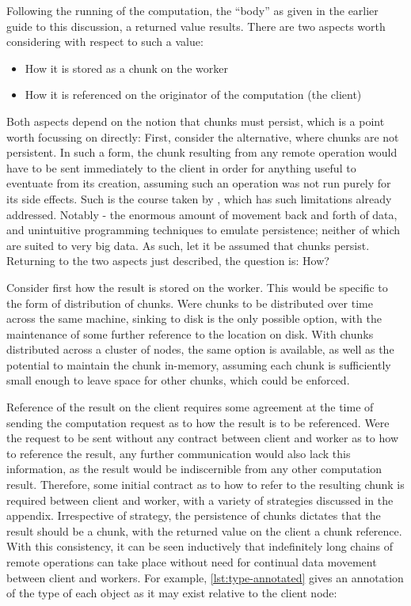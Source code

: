 Following the running of the computation, the ``body'' as given in the earlier guide to this discussion, a returned value results.
There are two aspects worth considering with respect to such a value:

\begin{itemize} \item How it is stored as a chunk on the worker \item How it is referenced on the originator of the computation (the client) \end{itemize}

Both aspects depend on the notion that chunks must persist, which is a point worth focussing on directly: First, consider the alternative, where chunks are not persistent.
In such a form, the chunk resulting from any remote operation would have to be sent immediately to the client in order for anything useful to eventuate from its creation, assuming such an operation was not run purely for its side effects.
Such is the course taken by , which has such limitations already addressed.
Notably - the enormous amount of movement back and forth of data, and unintuitive programming techniques to emulate persistence; neither of which are suited to very big data.
As such, let it be assumed that chunks persist.
Returning to the two aspects just described, the question is: How?

Consider first how the result is stored on the worker.
This would be specific to the form of distribution of chunks.
Were chunks to be distributed over time across the same machine, sinking to disk is the only possible option, with the maintenance of some further reference to the location on disk.
With chunks distributed across a cluster of nodes, the same option is available, as well as the potential to maintain the chunk in-memory, assuming each chunk is sufficiently small enough to leave space for other chunks, which could be enforced.

Reference of the result on the client requires some agreement at the time of sending the computation request as to how the result is to be referenced.
Were the request to be sent without any contract between client and worker as to how to reference the result, any further communication would also lack this information, as the result would be indiscernible from any other computation result.
Therefore, some initial contract as to how to refer to the resulting chunk is required between client and worker, with a variety of strategies discussed in the appendix.
Irrespective of strategy, the persistence of chunks dictates that the result should be a chunk, with the returned value on the client a chunk reference.
With this consistency, it can be seen inductively that indefinitely long chains of remote operations can take place without need for continual data movement between client and workers.
For example, \cref{lst:type-annotated} gives an annotation of the type of each object as it may exist relative to the client node:

